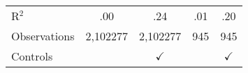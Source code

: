 {\begin{tabular}{lcccc}
R$^2$                               
                                    
                                    &         .00         &         .24      
                                    &         .01         &         .20   \\
Observations                            
                                   
                                    &  2,102277   &     2,102277  
                                    &    945     &         945                      \\
\midrule

Controls                 &         & $\checkmark$                        &         & $\checkmark$                       \\ 

\bottomrule

\end{tabular}
}

